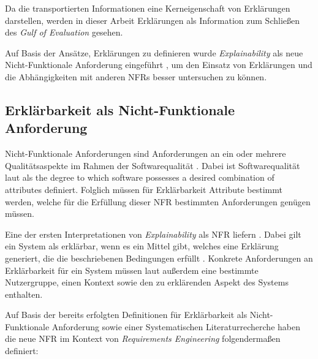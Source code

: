 Da die transportierten Informationen eine Kerneigenschaft von Erklärungen darstellen, werden in dieser Arbeit Erklärungen als Information zum Schließen des \textit{Gulf of Evaluation} \cite{norman1988psychology} gesehen.

Auf Basis der Ansätze, Erklärungen zu definieren wurde \textit{Explainability} als neue Nicht-Funktionale Anforderung eingeführt \cite{kohl_explainability_2019}, um den Einsatz von Erklärungen und die Abhängigkeiten mit anderen NFRs besser untersuchen zu können.

\subsection{Erklärbarkeit als Nicht-Funktionale Anforderung}
\label{02_basics:explainability}

Nicht-Funktionale Anforderungen sind Anforderungen an ein oder mehrere Qualitätsaspekte im Rahmen der Softwarequalität \cite{chung2009non,schneider2012abenteuer}. Dabei ist Softwarequalität laut  als \glqq [...] the degree to which software possesses a desired combination of attributes\grqq{}\cite{international1992ieee} definiert. Folglich müssen für Erklärbarkeit Attribute bestimmt werden, welche für die Erfüllung dieser NFR bestimmten Anforderungen genügen müssen.

Eine der ersten Interpretationen von \textit{Explainability} als NFR liefern \citeauthor{kohl_explainability_2019}. Dabei gilt ein System als erklärbar, wenn es ein Mittel gibt, welches eine Erklärung generiert, die die beschriebenen Bedingungen erfüllt \cite{kohl_explainability_2019}. Konkrete Anforderungen an Erklärbarkeit für ein System müssen laut \citeauthor{kohl_explainability_2019} außerdem eine bestimmte Nutzergruppe, einen Kontext sowie den zu erklärenden Aspekt des Systems enthalten.

Auf Basis der bereits erfolgten Definitionen für Erklärbarkeit als Nicht-Funktionale Anforderung sowie einer Systematischen Literaturrecherche haben \citeauthor{chazette_knowledge_nodate} die neue NFR im Kontext von \textit{Requirements Engineering} folgendermaßen definiert:

\smallskip

\noindent{}

